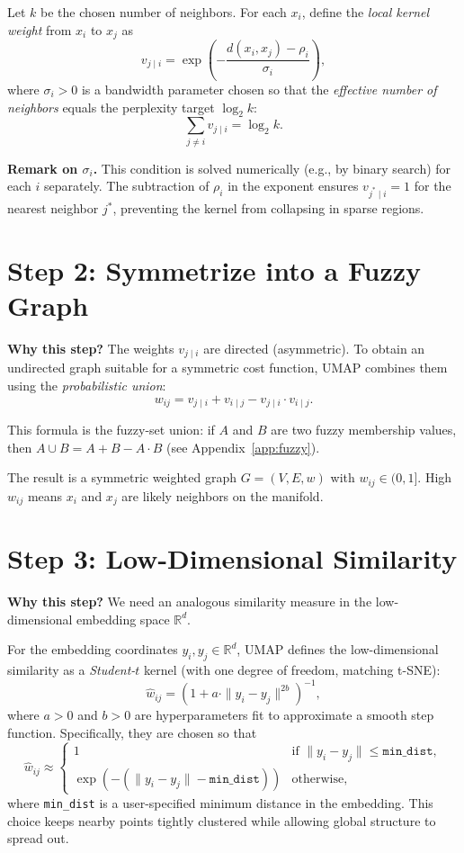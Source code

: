 \documentclass[11pt]{article}
\begin{document}
Let $k$ be the chosen number of neighbors. For each $x_i$, define the \emph{local kernel weight} from $x_i$ to $x_j$ as
\[
  v_{j \mid i} = \exp\!\left(-\frac{d(x_i, x_j) - \rho_i}{\sigma_i}\right),
\]
where $\sigma_i > 0$ is a bandwidth parameter chosen so that the \emph{effective number of neighbors} equals the perplexity target $\log_2 k$:
\[
  \sum_{j \neq i} v_{j \mid i} = \log_2 k.
\]

\textbf{Remark on $\sigma_i$.} This condition is solved numerically (e.g., by binary search) for each $i$ separately. The subtraction of $\rho_i$ in the exponent ensures $v_{j^* \mid i} = 1$ for the nearest neighbor $j^*$, preventing the kernel from collapsing in sparse regions.

\section*{Step 2: Symmetrize into a Fuzzy Graph}

\textbf{Why this step?} The weights $v_{j \mid i}$ are directed (asymmetric). To obtain an undirected graph suitable for a symmetric cost function, UMAP combines them using the \emph{probabilistic union}:
\[
  w_{ij} = v_{j \mid i} + v_{i \mid j} - v_{j \mid i} \cdot v_{i \mid j}.
\]

This formula is the fuzzy-set union: if $A$ and $B$ are two fuzzy membership values, then $A \cup B = A + B - A \cdot B$ (see Appendix~\ref{app:fuzzy}).

The result is a symmetric weighted graph $G = (V, E, w)$ with $w_{ij} \in (0, 1]$. High $w_{ij}$ means $x_i$ and $x_j$ are likely neighbors on the manifold.

\section*{Step 3: Low-Dimensional Similarity}

\textbf{Why this step?} We need an analogous similarity measure in the low-dimensional embedding space $\mathbb{R}^d$.

For the embedding coordinates $y_i, y_j \in \mathbb{R}^d$, UMAP defines the low-dimensional similarity as a \emph{Student-$t$} kernel (with one degree of freedom, matching t-SNE):
\[
  \hat{w}_{ij} = \left(1 + a \cdot \|y_i - y_j\|^{2b}\right)^{-1},
\]
where $a > 0$ and $b > 0$ are hyperparameters fit to approximate a smooth step function. Specifically, they are chosen so that
\[
  \hat{w}_{ij} \approx
  \begin{cases}
    1 & \text{if } \|y_i - y_j\| \leq \texttt{min\_dist}, \\
    \exp\!\left(-(\|y_i - y_j\| - \texttt{min\_dist})\right) & \text{otherwise},
  \end{cases}
\]
where \texttt{min\_dist} is a user-specified minimum distance in the embedding. This choice keeps nearby points tightly clustered while allowing global structure to spread out.
\end{document}
